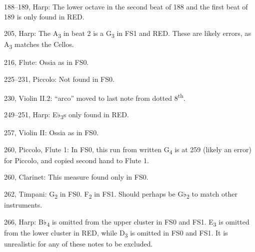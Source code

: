 \documentclass[twoside]{article}
\begin{document}
\begin{hangparas}{15pt}{1}
\begin{multicols}{2}
188--189, Harp: The lower octave in the second beat of 188 and the first beat of 189 is only found in RED.

205, Harp: The A\textsubscript{3} in beat 2 is a G\textsubscript{3} in FS1 and RED. These are likely errors, as A\textsubscript{3} matches the Cellos.

216, Flute: Ossia as in FS0.

225--231, Piccolo: Not found in FS0.

230, Violin II.2: ``arco'' moved to last note from dotted 8\textsuperscript{th}.

249--251, Harp: E♭\textsubscript{3}s only found in RED.

257, Violin II: Ossia as in FS0.

260, Piccolo, Flute 1: In FS0, this run from written G\textsubscript{4} is at 259 (likely an error) for Piccolo, and copied second hand to Flute 1.

260, Clarinet: This measure found only in FS0.

262, Timpani: G\textsubscript{2} in FS0. F\textsubscript{2} in FS1. Should perhaps be G♭\textsubscript{2} to match other instruments.

266, Harp: B♭\textsubscript{4} is omitted from the upper cluster in FS0 and FS1. E\textsubscript{3} is omitted from the lower cluster in RED, while D\textsubscript{3} is omitted in FS0 and FS1. It is unrealistic for any of these notes to be excluded.

\end{multicols}

\end{hangparas}
\end{document}
